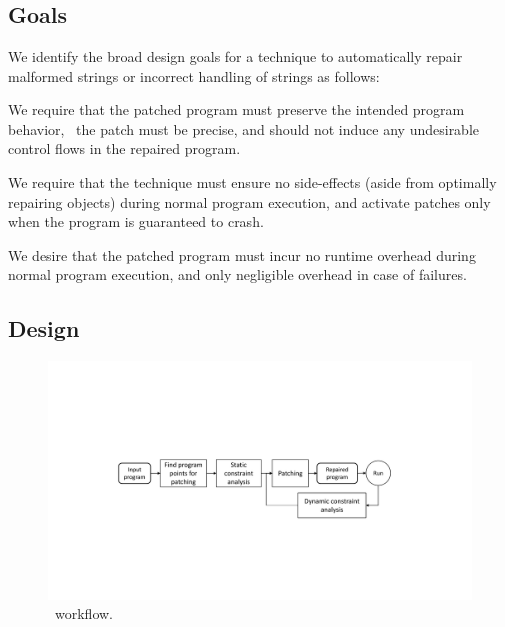 \section{\tool}
\label{sec:tool}

\subsection{Goals}
\label{sec:tool:goals}

We identify the broad design goals for a technique to automatically repair
malformed strings or incorrect handling of strings as follows:


 We require that the patched program must
preserve the intended program behavior, \ie\ the patch must be precise, and
should not induce any undesirable control flows in the repaired program.

 We require that the technique
must ensure no side-effects (aside from optimally repairing objects) during
normal program execution, and activate patches only when the program is
guaranteed to crash.

 We desire that the patched program must
incur no runtime overhead during normal program execution, and only negligible
overhead in case of failures.

\subsection{Design}
\label{sec:tool:design}

\begin{figure}[t]
\centering
\includegraphics[scale=.38]{images/NewDesignDiagram.pdf}
\caption{\tool\ workflow.}
\label{fig:overallDesign}
\end{figure}


